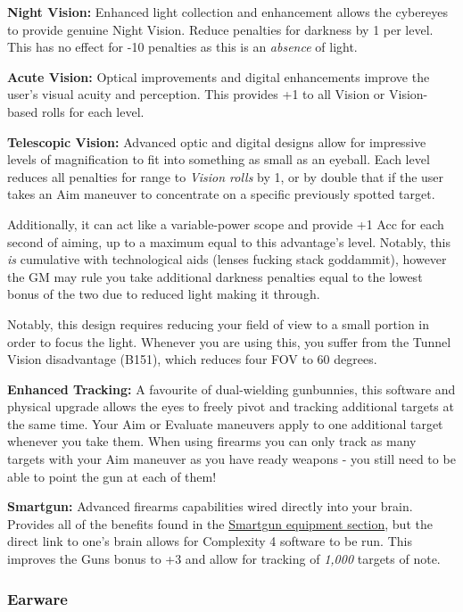 \begin{multicols*}{3}
	\textbf{Night Vision:} Enhanced light collection and enhancement allows the cybereyes to provide genuine Night Vision. Reduce penalties for darkness by 1 per level. This has no effect for -10 penalties as this is an \textit{absence} of light.
	
	\textbf{Acute Vision:} Optical improvements and digital enhancements improve the user's visual acuity and perception. This provides +1 to all Vision or Vision-based rolls for each level.
	
	\textbf{Telescopic Vision:} Advanced optic and digital designs allow for impressive levels of magnification to fit into something as small as an eyeball. Each level reduces all penalties for range to \textit{Vision rolls} by 1, or by double that if the user takes an Aim maneuver to concentrate on a specific previously spotted target. 
	
	Additionally, it can act like a variable-power scope and provide +1 Acc for each second of aiming, up to a maximum equal to this advantage's level. Notably, this \textit{is} cumulative with technological aids (lenses fucking stack goddammit), however the GM may rule you take additional darkness penalties equal to the lowest bonus of the two due to reduced light making it through.
	
	Notably, this design requires reducing your field of view to a small portion in order to focus the light. Whenever you are using this, you suffer from the Tunnel Vision disadvantage (B151), which reduces four FOV to 60 degrees.
	
	\textbf{Enhanced Tracking:} A favourite of dual-wielding gunbunnies, this software and physical upgrade allows the eyes to freely pivot and tracking additional targets at the same time. Your Aim or Evaluate maneuvers apply to one additional target whenever you take them. When using firearms you can only track as many targets with your Aim maneuver as you have ready weapons - you still need to be able to point the gun at each of them!
	
	\textbf{Smartgun:} Advanced firearms capabilities wired directly into your brain. Provides all of the benefits found in the \hyperref[smartgun]{Smartgun equipment section}, but the direct link to one's brain allows for Complexity 4 software to be run. This improves the Guns bonus to +3 and allow for tracking of \textit{1,000} targets of note.
	
	\subsubsection{Earware}
	

\end{multicols*}
